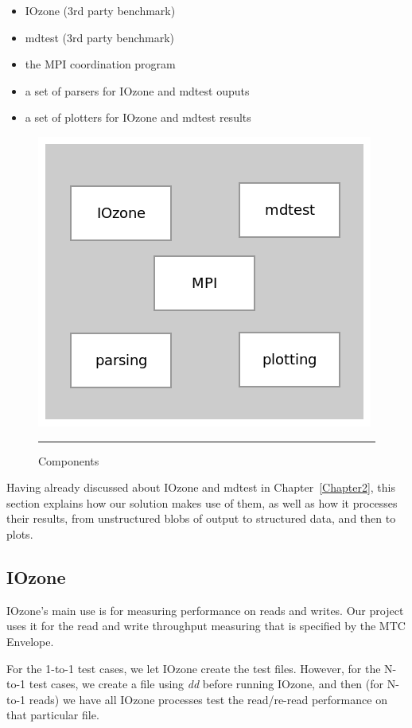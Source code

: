 \begin{itemize}

\item IOzone (3rd party benchmark)
\item mdtest (3rd party benchmark)
\item the MPI coordination program
\item a set of parsers for IOzone and mdtest ouputs
\item a set of plotters for IOzone and mdtest results

\end{itemize}

\begin{figure}[H]
  \centering
    \includegraphics[scale=0.5]{Figures/components.png}
    \rule{25em}{0.5pt}
  \caption[Components]{Components}
  \label{fig:components}
\end{figure}

Having already discussed about IOzone and mdtest in Chapter~\ref{Chapter2}, this section explains how our solution makes use of them, as well as how it processes their results, from unstructured blobs of output to structured data, and then to plots.


\subsection{IOzone}

IOzone's main use is for measuring performance on reads and writes. Our project uses it for the read and write throughput measuring that is specified by the MTC Envelope.

For the 1-to-1 test cases, we let IOzone create the test files. However, for the N-to-1 test cases, we create a file using \textit{dd} before running IOzone, and then (for N-to-1 reads) we have all IOzone processes test the read/re-read performance on that particular file.

